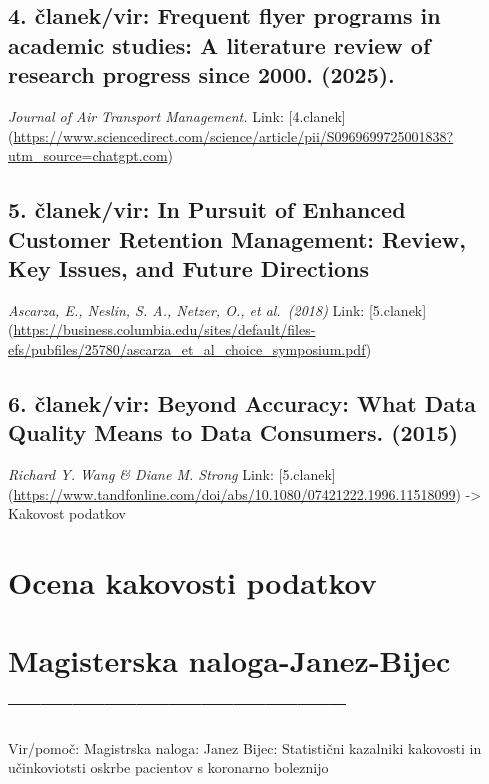 \documentclass[
]{article}
\begin{document}
\subsection{4. članek/vir: Frequent flyer programs in academic studies:
A literature review of research progress since 2000.
(2025).}\label{ux10dlanekvir-frequent-flyer-programs-in-academic-studies-a-literature-review-of-research-progress-since-2000.-2025.}

\emph{Journal of Air Transport Management.} Link: {[}4.clanek{]}
(\url{https://www.sciencedirect.com/science/article/pii/S0969699725001838?utm_source=chatgpt.com})

\subsection{5. članek/vir: In Pursuit of Enhanced Customer Retention
Management: Review, Key Issues, and Future
Directions}\label{ux10dlanekvir-in-pursuit-of-enhanced-customer-retention-management-review-key-issues-and-future-directions}

\emph{Ascarza, E., Neslin, S. A., Netzer, O., et al.~(2018)} Link:
{[}5.clanek{]}
(\url{https://business.columbia.edu/sites/default/files-efs/pubfiles/25780/ascarza_et_al_choice_symposium.pdf})

\subsection{6. članek/vir: Beyond Accuracy: What Data Quality Means to
Data Consumers.
(2015)}\label{ux10dlanekvir-beyond-accuracy-what-data-quality-means-to-data-consumers.-2015}

\emph{Richard Y. Wang \& Diane M. Strong} Link: {[}5.clanek{]}
(\url{https://www.tandfonline.com/doi/abs/10.1080/07421222.1996.11518099})
-\textgreater{} Kakovost podatkov

\section{Ocena kakovosti podatkov}\label{ocena-kakovosti-podatkov}

\section{Magisterska
naloga-Janez-Bijec--------------------------------}\label{magisterska-naloga-janez-bijec}

Vir/pomoč: Magistrska naloga: Janez Bijec: Statistični kazalniki
kakovosti in učinkoviotsti oskrbe pacientov s koronarno boleznijo
\end{document}
